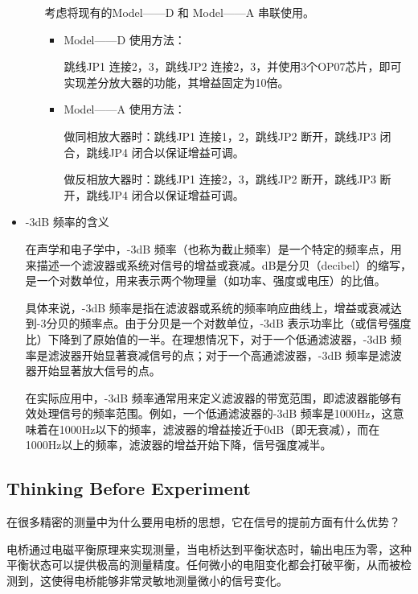 \begin{itemize}
\begin{enumerate}
					考虑将现有的Model——D 和 Model——A 串联使用。

					\begin{itemize}
						\item Model——D 使用方法：
							
							跳线JP1 连接2，3，跳线JP2 连接2，3，并使用3个OP07芯片，即可实现差分放大器的功能，其增益固定为10倍。

						\item Model——A 使用方法：
						
							做同相放大器时：跳线JP1 连接1，2，跳线JP2 断开，跳线JP3 闭合，跳线JP4 闭合以保证增益可调。

							做反相放大器时：跳线JP1 连接2，3，跳线JP2 断开，跳线JP3 断开，跳线JP4 闭合以保证增益可调。
					\end{itemize}
			\end{enumerate}


		\item -3dB 频率的含义
			
			在声学和电子学中，-3dB 频率（也称为截止频率）是一个特定的频率点，用来描述一个滤波器或系统对信号的增益或衰减。dB是分贝（decibel）的缩写，是一个对数单位，用来表示两个物理量（如功率、强度或电压）的比值。

			具体来说，-3dB 频率是指在滤波器或系统的频率响应曲线上，增益或衰减达到-3分贝的频率点。由于分贝是一个对数单位，-3dB 表示功率比（或信号强度比）下降到了原始值的一半。在理想情况下，对于一个低通滤波器，-3dB 频率是滤波器开始显著衰减信号的点；对于一个高通滤波器，-3dB 频率是滤波器开始显著放大信号的点。
			
			在实际应用中，-3dB 频率通常用来定义滤波器的带宽范围，即滤波器能够有效处理信号的频率范围。例如，一个低通滤波器的-3dB 频率是1000Hz，这意味着在1000Hz以下的频率，滤波器的增益接近于0dB（即无衰减），而在1000Hz以上的频率，滤波器的增益开始下降，信号强度减半。
	\end{itemize}


\subsection{Thinking Before Experiment}

\begin{question}
	在很多精密的测量中为什么要用电桥的思想，它在信号的提前方面有什么优势？
\end{question}
	
	电桥通过电磁平衡原理来实现测量，当电桥达到平衡状态时，输出电压为零，这种平衡状态可以提供极高的测量精度。任何微小的电阻变化都会打破平衡，从而被检测到，这使得电桥能够非常灵敏地测量微小的信号变化。


